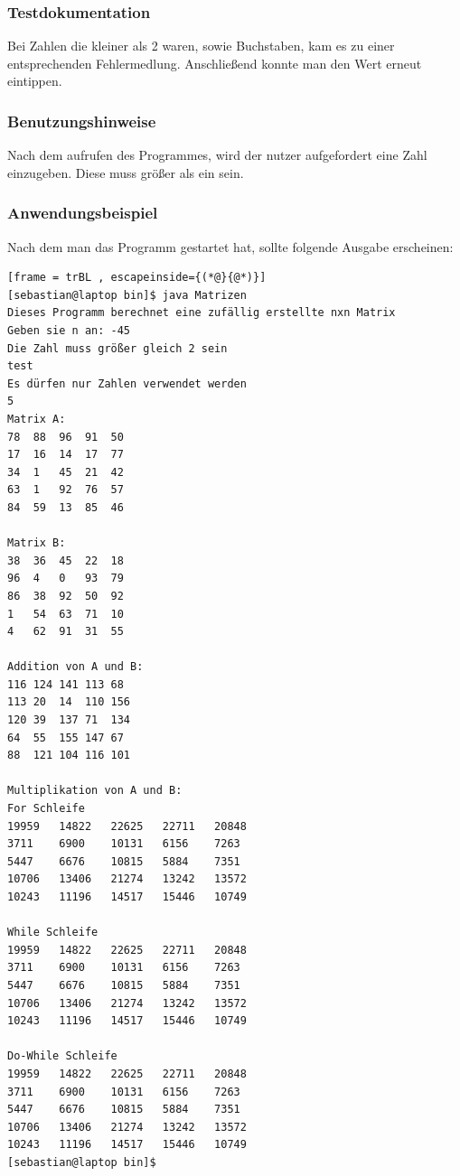 \subsubsection{Testdokumentation}
Bei Zahlen die kleiner als 2 waren, sowie Buchstaben, kam es zu einer entsprechenden Fehlermedlung. Anschließend konnte man den Wert erneut eintippen.

\subsubsection{Benutzungshinweise}
Nach dem aufrufen des Programmes, wird der nutzer aufgefordert eine Zahl einzugeben.
Diese muss grö\ss er als ein sein.

\subsubsection{Anwendungsbeispiel}
Nach dem man das Programm gestartet hat, sollte folgende Ausgabe erscheinen:
\begin{lstlisting}[frame = trBL , escapeinside={(*@}{@*)}]
[sebastian@laptop bin]$ java Matrizen 
Dieses Programm berechnet eine zufällig erstellte nxn Matrix
Geben sie n an: -45
Die Zahl muss größer gleich 2 sein
test
Es dürfen nur Zahlen verwendet werden
5
Matrix A:
78	88	96	91	50	
17	16	14	17	77	
34	1	45	21	42	
63	1	92	76	57	
84	59	13	85	46	

Matrix B:
38	36	45	22	18	
96	4	0	93	79	
86	38	92	50	92	
1	54	63	71	10	
4	62	91	31	55	

Addition von A und B:
116	124	141	113	68	
113	20	14	110	156	
120	39	137	71	134	
64	55	155	147	67	
88	121	104	116	101	

Multiplikation von A und B:
For Schleife
19959	14822	22625	22711	20848	
3711	6900	10131	6156	7263	
5447	6676	10815	5884	7351	
10706	13406	21274	13242	13572	
10243	11196	14517	15446	10749	

While Schleife
19959	14822	22625	22711	20848	
3711	6900	10131	6156	7263	
5447	6676	10815	5884	7351	
10706	13406	21274	13242	13572	
10243	11196	14517	15446	10749	

Do-While Schleife
19959	14822	22625	22711	20848	
3711	6900	10131	6156	7263	
5447	6676	10815	5884	7351	
10706	13406	21274	13242	13572	
10243	11196	14517	15446	10749
[sebastian@laptop bin]$ 
\end{lstlisting}